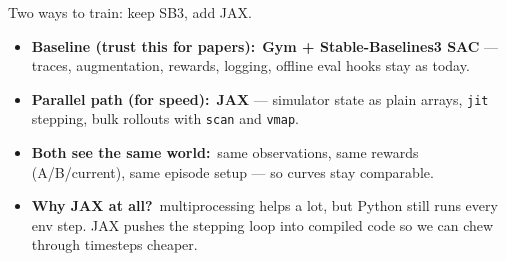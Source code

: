 \documentclass[11pt,aspectratio=43]{beamer}
\begin{document}

\begin{frame}{Two ways to train: keep SB3, add JAX.}

  \vspace{0.3em}
  \begin{itemize}
    \setlength{\itemsep}{0.75em}
    \item \textbf{Baseline (trust this for papers):}\ \textbf{Gym + Stable-Baselines3 SAC} ---
          traces, augmentation, rewards, logging, offline eval hooks stay as today.
    \item \textbf{Parallel path (for speed):}\ \textbf{JAX} ---
          simulator state as plain arrays, \texttt{jit} stepping, bulk rollouts with \texttt{scan} and \texttt{vmap}.
    \item \textbf{Both see the same world:}\ same observations, same rewards (A/B/current), same episode setup --- so curves stay comparable.
    \item \textbf{Why JAX at all?}\ multiprocessing helps a lot, but Python still runs every env step.
          JAX pushes the stepping loop into compiled code so we can chew through timesteps cheaper.
  \end{itemize}

\end{frame}

\end{document}
